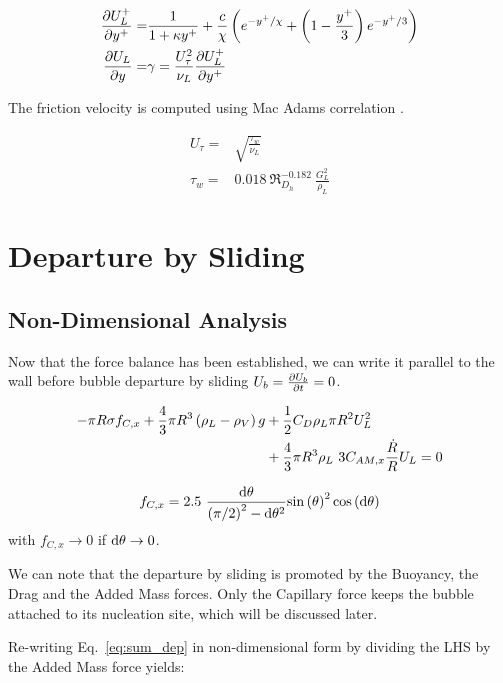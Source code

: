 \begin{align}
\dpartial{U_{L}^{+}}{y^{+}} =& \frac{1}{1+\kappa y^{+}}+\frac{c}{\chi}\parth{e^{-y^{+}/\chi} + \parth{1-\frac{y^{+}}{3}}e^{-y^{+}/3}}\\
%
\nonumber \dpartial{U_{L}}{y} =& \gamma = \frac{U_{\tau}^{2}}{\nu_{L}} \dpartial{U_{L}^{+}}{y^{+}}
\end{align}

The friction velocity is computed using Mac Adams correlation \cite{mcadams_heat_1954}.

\begin{align}
U_{\tau} =& \sqrt{\frac{\tau_{w}}{\nu_{L}}}\\
\tau_{w} =& 0.018~ \Re_{D_{h}}^{-0.182}~ \frac{G_{L}^{2}}{\rho_{L}}
\end{align}

\section{Departure by Sliding}\label{sec:departure}

\subsection{Non-Dimensional Analysis}\label{subsec:adim_dep}

Now that the force balance has been established, we can write it parallel to the wall before bubble departure by sliding \ie $U_{b}=\frac{\partial{U_{b}}}{\partial t}=0$.

\begin{align}
\label{eq:sum_dep}
\nonumber - \pi R\sigma f_{C,x} + \frac{4}{3}\pi R^{3}\left( \rho_{L}-\rho_{V} \right)g &+ \frac{1}{2}C_{D}\rho_{L}\pi R^{2} U_{L}^{2} \\
& + \frac{4}{3}\pi R^{3}\rho_{L}~3C_{AM,x}\frac{\dot{R}}{R}U_{L} = 0
\end{align}

\begin{equation}
 f_{C,x}=2.5\ \frac{\mathrm{d}\theta}{\left( \pi/2 \right)^{2}-\mathrm{d}\theta^{2}}\mathrm{sin}\left( \theta \right)^{2}\mathrm{cos}\left( \mathrm{d}\theta \right)
\end{equation}
with $f_{C,x} \to 0 $ if $\mathrm{d}\theta \to 0$.


We can note that the departure by sliding is promoted by the Buoyancy, the Drag and the Added Mass forces. Only the Capillary force keeps the bubble attached to its nucleation site, which will be discussed later.


\npar
Re-writing Eq.~\ref{eq:sum_dep} in non-dimensional form by dividing the LHS by the Added Mass force yields:

